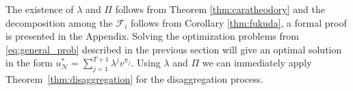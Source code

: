 \noindent
The existence of $\lambda$ and $\Pi$ follows from Theorem \ref{thm:caratheodory} and the decomposition among the $\mathcal{F}_i$ follows from Corollary \ref{thm:fukuda}, a formal proof is presented in the Appendix.
Solving the optimization problems from \eqref{eq:general_prob} described in the previous section will give an optimal solution in the form $u_{\mathcal{N}}^* = \sum_{j=1}^{T+1} \lambda^j v^{\pi_j}$. Using $\lambda$ and $\Pi$ we can immediately apply Theorem~\ref{thm:disaggregation} for the disaggregation process.
